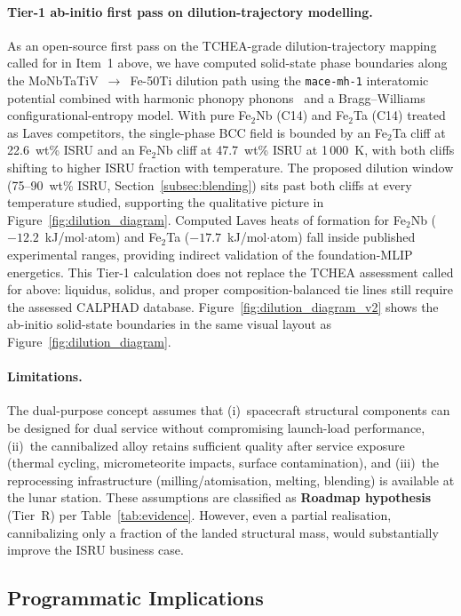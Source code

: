\documentclass[11pt,a4paper]{article}
\begin{document}
\paragraph{Tier-1 ab-initio first pass on dilution-trajectory modelling.}
As an open-source first pass on the TCHEA-grade dilution-trajectory mapping called for in Item~1 above, we have computed solid-state phase boundaries along the MoNbTaTiV~$\rightarrow$~Fe-50Ti dilution path using the \texttt{mace-mh-1} interatomic potential combined with harmonic phonopy phonons~\cite{Togo2015Phonopy} and a Bragg--Williams configurational-entropy model. With pure Fe$_2$Nb (C14) and Fe$_2$Ta (C14) treated as Laves competitors, the single-phase BCC field is bounded by an Fe$_2$Ta cliff at 22.6~wt\% ISRU and an Fe$_2$Nb cliff at 47.7~wt\% ISRU at 1\,000~K, with both cliffs shifting to higher ISRU fraction with temperature. The proposed dilution window (75--90~wt\% ISRU, Section~\ref{subsec:blending}) sits past both cliffs at every temperature studied, supporting the qualitative picture in Figure~\ref{fig:dilution_diagram}. Computed Laves heats of formation for Fe$_2$Nb ($-12.2$~kJ/mol$\cdot$atom) and Fe$_2$Ta ($-17.7$~kJ/mol$\cdot$atom) fall inside published experimental ranges, providing indirect validation of the foundation-MLIP energetics. This Tier-1 calculation does not replace the TCHEA assessment called for above: liquidus, solidus, and proper composition-balanced tie lines still require the assessed CALPHAD database. Figure~\ref{fig:dilution_diagram_v2} shows the ab-initio solid-state boundaries in the same visual layout as Figure~\ref{fig:dilution_diagram}.

\paragraph{Limitations.}
The dual-purpose concept assumes that (i)~spacecraft structural components can be designed for dual service without compromising launch-load performance, (ii)~the cannibalized alloy retains sufficient quality after service exposure (thermal cycling, micrometeorite impacts, surface contamination), and (iii)~the reprocessing infrastructure (milling/atomisation, melting, blending) is available at the lunar station. These assumptions are classified as \textbf{Roadmap hypothesis} (Tier~R) per Table~\ref{tab:evidence}. However, even a partial realisation, cannibalizing only a fraction of the landed structural mass, would substantially improve the ISRU business case.

\subsection{Programmatic Implications}
\label{subsec:programmatic}
\end{document}
